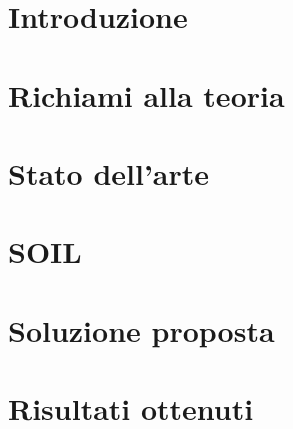\documentclass[11pt, english]{article}
\begin{document}
\newcommand{\CC}{C\nolinebreak\hspace{-.05em}\raisebox{.4ex}{\tiny\bf +}\nolinebreak\hspace{-.10em}\raisebox{.4ex}{\tiny\bf +}}
\def\CC{{C\nolinebreak[4]\hspace{-.05em}\raisebox{.4ex}{\tiny\bf ++}}}

\tableofcontents

\newpage

\section{Introduzione}

\section{Richiami alla teoria}

\section{Stato dell'arte}

\section{SOIL}

\section{Soluzione proposta}

\section{Risultati ottenuti}
\end{document}
